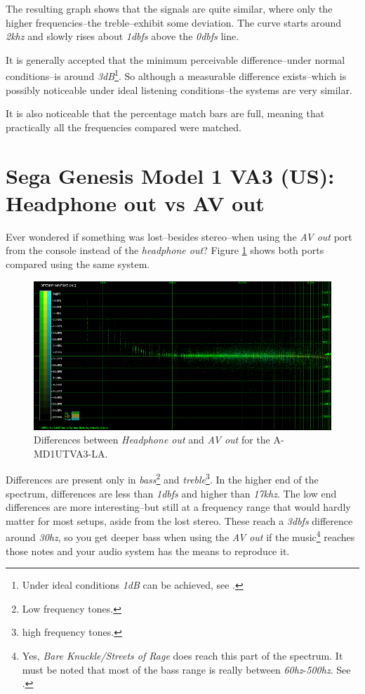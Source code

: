\documentclass[10pt,a4paper]{report}
\newcommand{\hz}[1]{\textit{#1\acrshort{hz}}}
\newcommand{\khz}[1]{\textit{#1\acrshort{khz}}}
\newcommand{\db}[1]{\textit{#1\acrshort{dbfs}}}
\begin{document}
The resulting graph shows that the signals are quite similar, where only the higher frequencies--the treble--exhibit some deviation. The curve starts around \khz{2} and slowly rises about \db{1} above the \db{0} line.

It is generally accepted that the minimum perceivable difference--under normal conditions--is around \textit{3dB}\footnote{Under ideal conditions \textit{1dB} can be achieved, see \cite{dbdiff}.}. So although a measurable difference exists--which is possibly noticeable under ideal listening conditions--the systems are very similar.

It is also noticeable that the percentage match bars are full, meaning that practically all the frequencies compared were matched.

\section{Sega Genesis Model 1 VA3 (US):\\ Headphone out vs AV out}

Ever wondered if something was lost--besides stereo--when using the \textit{AV out} port from the console instead of the \textit{headphone out}? Figure \ref{fig:A-MD1UTVA3-LA_vs_A-MD1UTVA3-AV-LA} shows both ports compared using the same system.

\begin{figure}[H]
	\centering
	\includegraphics[width=1.0\linewidth]{images/results/1-A-MD1UTVA3-LA_vs_A-MD1UTVA3-AV-LA.png}
	\caption[A-MD1UTVA3-LA AV Out]{Differences between \textit{Headphone out} and \textit{AV out} for the A-MD1UTVA3-LA.}
	\label{fig:A-MD1UTVA3-LA_vs_A-MD1UTVA3-AV-LA}
\end{figure}

Differences are present only in \textit{bass}\footnote{Low frequency tones.} and \textit{treble}\footnote{high frequency tones.}. In the higher end of the spectrum, differences are less than \db{1} and higher than \khz{17}. The low end differences are more interesting--but still at a frequency range that would hardly matter for most setups, aside from the lost stereo. These reach a \db{3} difference around \hz{30}, so you get deeper bass when using the \textit{AV out} if the music\footnote{Yes, \textit{Bare Knuckle/Streets of Rage} does reach this part of the spectrum. It must be noted that most of the bass range is really between \hz{60}-\hz{500}. See \cite{bass}.} reaches those notes and your audio system has the means to reproduce it.
\end{document}
